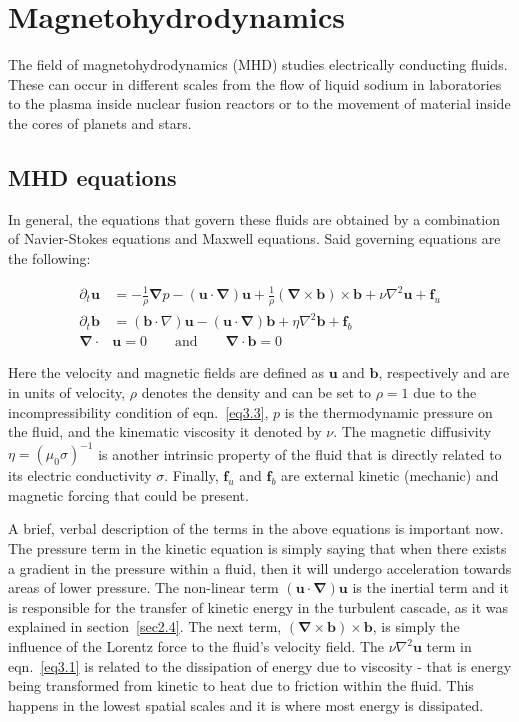 \documentclass[12pt,a4paper]{report}
\begin{document}
\chapter{Magnetohydrodynamics}

The field of magnetohydrodynamics (MHD) studies electrically conducting fluids. These can occur in different scales from the flow of liquid sodium in laboratories to the plasma inside nuclear fusion reactors or to the movement of material inside the cores of planets and stars. 

\section{MHD equations}

In general, the equations that govern these fluids are obtained by a combination of Navier-Stokes equations and Maxwell equations. Said governing equations are the following:

\begin{align}
\partial_t \bm u &= - \frac{1}{\rho} \bm \nabla p - (\bm u \cdot \bm \nabla) \bm u + \frac{1}{\rho} (\bm \nabla \times \bm b) \times \bm b + \nu \nabla^2 \bm u + \bm f_u \label{eq3.1} \\
\partial_t \bm b &= (\bm b \cdot \nabla) \bm u - (\bm u \cdot \bm \nabla) \bm b + \eta \nabla^2 \bm b + \bm f_b \label{eq3.2} \\
\bm \nabla \cdot &\bm u = 0 \qquad \text{and} \qquad \bm \nabla \cdot \bm b = 0 \label{eq3.3}
\end{align}

Here the velocity and magnetic fields are defined as $\bm u$ and $\bm b$, respectively and are in units of velocity, $\rho$ denotes the density and can be set to $\rho = 1$ due to the incompressibility condition of eqn.~\ref{eq3.3}, $p$ is the thermodynamic pressure on the fluid, and the kinematic viscosity it denoted by $\nu$. The magnetic diffusivity $\eta=(\mu_0\sigma)^{-1}$ is another intrinsic property of the fluid that is directly related to its electric conductivity $\sigma$. Finally, $\bm f_u$ and $\bm f_b$ are external kinetic (mechanic) and magnetic forcing that could be present. 

A brief, verbal description of the terms in the above equations is important now. The pressure term in the kinetic equation is simply saying that when there exists a gradient in the pressure within a fluid, then it will undergo acceleration towards areas of lower pressure. The non-linear term $(\bm u \cdot \bm \nabla)\bm u$ is the inertial term and it is responsible for the transfer of kinetic energy in the turbulent cascade, as it was explained in section~\ref{sec2.4}. The next term, $(\bm \nabla \times \bm b) \times \bm b$, is simply the influence of the Lorentz force to the fluid's velocity field. The $\nu \nabla^2 \bm u$ term in eqn.~\ref{eq3.1} is related to the dissipation of energy due to viscosity - that is energy being transformed from kinetic to heat due to friction  within the fluid. This happens in the lowest spatial scales and it is where most energy is dissipated.
\end{document}
